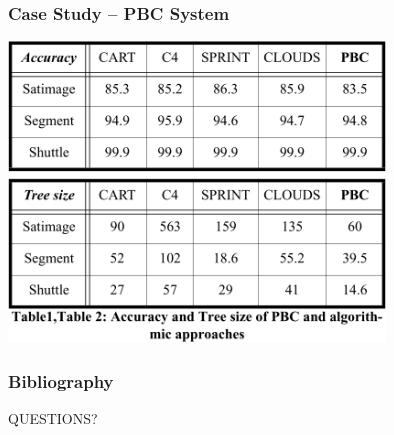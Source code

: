 \documentclass[xcolor=svgnames]{beamer}
\begin{document}
\begin{frame}
	\frametitle{Case Study -- PBC System}
	\begin{center}
		\includegraphics[width=0.75\textwidth]{2013-IA080-interactive-machine-learning/pbc-results.png}
	\end{center}
\end{frame}
\begin{frame}[allowframebreaks]
	\frametitle<presentation>{Bibliography}
	
	\nocite{Fails2003}
	\nocite{Ankerst1999}
	\nocite{Ware2001}
	
\end{frame}
\begin{frame}
	\begin{center}
		{\Huge QUESTIONS?}
	\end{center}
\end{frame}
\end{document}
